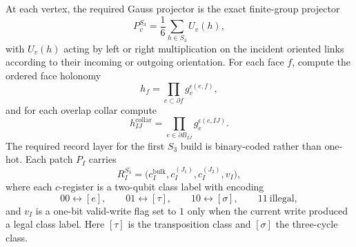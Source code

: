 \documentclass[11pt]{article}
\begin{document}
At each vertex, the required Gauss projector is the exact finite-group projector
\begin{equation}
P_v^{S_3}
=
\frac{1}{6}\sum_{h\in S_3} U_v(h),
\end{equation}
with $U_v(h)$ acting by left or right multiplication on the incident oriented links according to
their incoming or outgoing orientation. For each face $f$, compute the ordered face holonomy
\begin{equation}
h_f=\prod_{e\subset \partial f} g_e^{\epsilon(e,f)},
\end{equation}
and for each overlap collar compute
\begin{equation}
h_{IJ}^{\mathrm{collar}}=\prod_{e\in \partial B_{IJ}} g_e^{\epsilon(e,IJ)}.
\end{equation}
The required record layer for the first $S_3$ build is binary-coded rather than one-hot. Each
patch $P_I$ carries
\begin{equation}
R_I^{S_3}=
\bigl(c_I^{\mathrm{bulk}},c_I^{(J_1)},c_I^{(J_2)},v_I\bigr),
\end{equation}
where each $c$-register is a two-qubit class label with encoding
\begin{equation}
00\leftrightarrow [e],\qquad
01\leftrightarrow [\tau],\qquad
10\leftrightarrow [\sigma],\qquad
11\ \text{illegal},
\end{equation}
and $v_I$ is a one-bit valid-write flag set to $1$ only when the current write produced a legal
class label. Here $[\tau]$ is the transposition class and $[\sigma]$ the three-cycle class.
\end{document}
